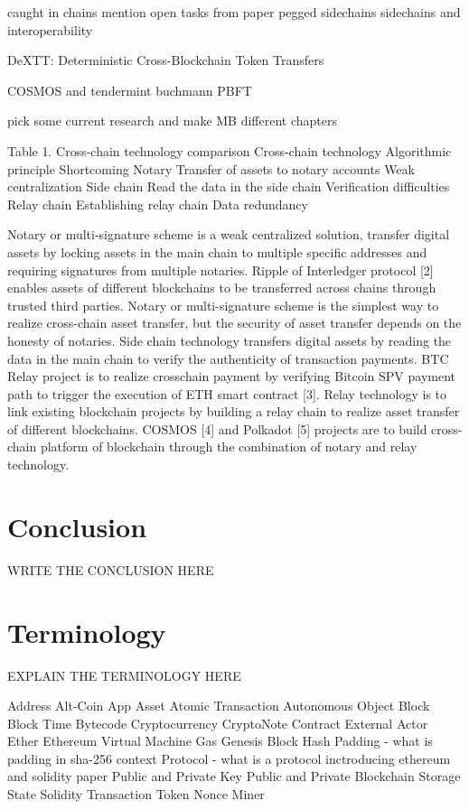 caught in chains mention open tasks from paper \cite{borkowski2018caught}
pegged sidechains \cite{back2014enabling}
sidechains and interoperability \cite{johnson2019sidechains}

DeXTT: Deterministic Cross-Blockchain Token Transfers \cite{borkowski2019dextt}

COSMOS \cite{kwon2018network} and tendermint \cite{kwon2014tendermint} buchmann \cite{buchman2016tendermint} PBFT \cite{castro1999practical}

pick some current research and make MB different chapters

Table 1. Cross-chain technology comparison
Cross-chain technology Algorithmic principle Shortcoming
Notary Transfer of assets to notary accounts Weak centralization
Side chain Read the data in the side chain Verification difficulties
Relay chain Establishing relay chain Data redundancy

Notary or multi-signature scheme is a weak centralized solution, transfer digital
assets by locking assets in the main chain to multiple specific addresses and requiring
signatures from multiple notaries. Ripple of Interledger protocol [2] enables assets of
different blockchains to be transferred across chains through trusted third parties. Notary
or multi-signature scheme is the simplest way to realize cross-chain asset transfer, but
the security of asset transfer depends on the honesty of notaries.
Side chain technology transfers digital assets by reading the data in the main chain
to verify the authenticity of transaction payments. BTC Relay project is to realize crosschain
payment by verifying Bitcoin SPV payment path to trigger the execution of ETH
smart contract [3].
Relay technology is to link existing blockchain projects by building a relay chain to
realize asset transfer of different blockchains. COSMOS [4] and Polkadot [5] projects
are to build cross-chain platform of blockchain through the combination of notary and
relay technology.

\chapter{Conclusion}
\label{ch:chapter07}
WRITE THE CONCLUSION HERE

\chapter{Terminology}
\label{ch:chapter08}
EXPLAIN THE TERMINOLOGY HERE

Address
Alt-Coin
App
Asset
Atomic Transaction
Autonomous Object
Block
Block Time
Bytecode
Cryptocurrency
CryptoNote
Contract 
External Actor
Ether
Ethereum Virtual Machine
Gas
Genesis Block
Hash
Padding - what is padding in sha-256 context
Protocol - what is a protocol inctroducing ethereum and solidity paper
Public and Private Key
Public and Private Blockchain
Storage State
Solidity
Transaction 
Token
Nonce
Miner








